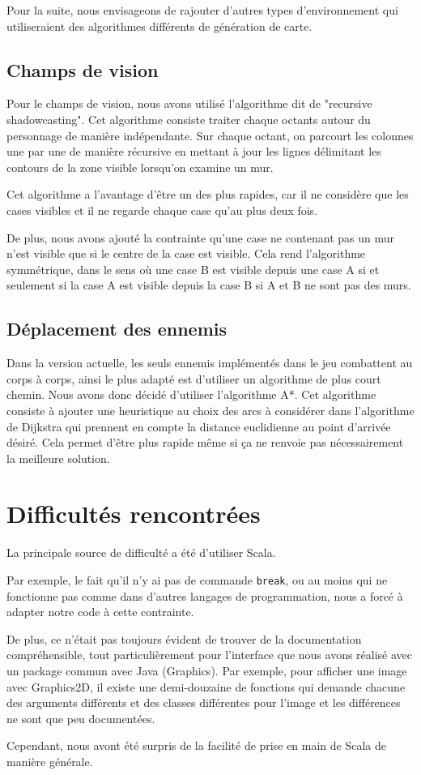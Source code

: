 \documentclass[10pt,a4paper]{article}
\begin{document}
Pour la suite, nous envisageons de rajouter d'autres types d'environnement qui utiliseraient des algorithmes différents de génération de carte.

\subsection{Champs de vision}

Pour le champs de vision, nous avons utilisé l'algorithme dit de "recursive shadowcasting". Cet algorithme consiste traiter chaque octants autour du personnage de manière indépendante. Sur chaque octant, on parcourt les colonnes une par une de manière récursive en mettant à jour les lignes délimitant les contours de la zone visible lorsqu'on examine un mur.

Cet algorithme a l'avantage d'être un des plus rapides, car il ne considère que les cases visibles et il ne regarde chaque case qu'au plus deux fois.

De plus, nous avons ajouté la contrainte qu'une case ne contenant pas un mur n'est visible que si le centre de la case est visible. Cela rend l'algorithme symmétrique, dans le sens où une case B est visible depuis une case A si et seulement si la case A est visible depuis la case B si A et B ne sont pas des murs.

\subsection{Déplacement des ennemis}

Dans la version actuelle, les seuls ennemis implémentés dans le jeu combattent au corps à corps, ainsi le plus adapté est d'utiliser un algorithme de plus court chemin. Nous avons donc décidé d'utiliser l'algorithme A*. Cet algorithme consiste à ajouter une heuristique au choix des arcs à considérer dans l'algorithme de Dijkstra qui prennent en compte la distance euclidienne au point d'arrivée désiré. Cela permet d'être plus rapide même si ça ne renvoie pas nécessairement la meilleure solution.

\section{Difficultés rencontrées}

La principale source de difficulté a été d'utiliser Scala.

Par exemple, le fait qu'il n'y ai pas de commande \texttt{break}, ou au moins qui ne fonctionne pas comme dans d'autres langages de programmation, nous a forcé à adapter notre code à cette contrainte.

De plus, ce n'était pas toujours évident de trouver de la documentation compréhensible, tout particulièrement pour l'interface que nous avons réalisé avec un package commun avec Java (Graphics). Par exemple, pour afficher une image avec Graphics2D, il existe une demi-douzaine de fonctions qui demande chacune des arguments différents et des classes différentes pour l'image et les différences ne sont que peu documentées.

Cependant, nous avont été surpris de la facilité de prise en main de Scala de manière générale.

\newpage

%
\end{document}
